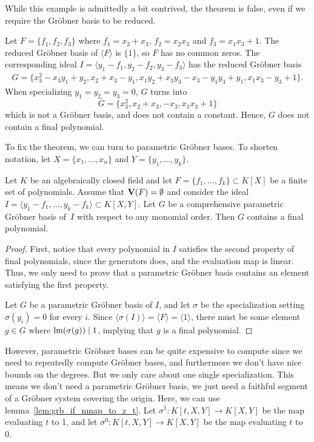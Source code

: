 While this example is admittedly a bit contrived, the theorem is false, even if we require the Gröbner basis to be reduced.

\begin{example}\upshape
    Let $F = \{f_1, f_2, f_3\}$ where $f_1 = x_2 + x_3$, $f_2 = x_2 x_3$ and $f_3 = x_1 x_3 + 1$. The reduced Gröbner basis of $\langle F \rangle$ is $\{1\}$, so $F$ has no common zeros. The corresponding ideal $I = \langle y_1 - f_1, y_2 - f_2, y_3 - f_3 \rangle$ has the reduced Gröbner basis
    \begin{gather*}
    G = \{ x_3^2 - x_3 y_1 + y_2, x_2 + x_3 - y_1, x_1 y_2 + x_3 y_3 - x_3 - y_1 y_3 + y_1, x_1 x_3 - y_3 + 1\}.
    \end{gather*}
    When specializing $y_1 = y_2 = y_3 = 0$, $G$ turns into
    \[\bar G = \{ x_3^2, x_2 + x_3, -x_3, x_1 x_3 + 1\}\]
    which is not a Gröbner basis, and does not contain a constant. Hence, $G$ does not contain a final polynomial.
\end{example}

To fix the theorem, we can turn to parametric Gröbner bases. To shorten notation, let $X = \{x_{1}, \dots, x_{n}\}$ and $Y = \{y_{1}, \dots, y_{k}\}$.

\begin{theorem}
  Let $K$ be an algebraically closed field and let $F = \{f_{1}, \dots, f_{k}\} \subset K[X]$ be a finite set of polynomials. Assume that $\operatorname{\mathbf V}(F) = \emptyset$ and consider the ideal $I = \langle y_{1} - f_{1}, \dots, y_{k} - f_{k} \rangle \subset K[X, Y]$. Let $G$ be a comprehensive parametric Gröbner basis of $\,I$ with respect to any monomial order. Then $G$ contains a final polynomial.
\end{theorem}
\begin{proof}
  First, notice that every polynomial in $I$ satisfies the second property of final polynomials, since the generators does, and the evaluation map is linear. Thus, we only need to prove that a parametric Gröbner basis contains an element satisfying the first property.

  Let $G$ be a parametric Gröbner basis of $I$, and let $\sigma$ be the specialization setting $\sigma(y_{i}) = 0$ for every $i$. Since $\langle \sigma(I) \rangle = \langle F \rangle = \langle 1 \rangle$, there must be some element $g \in G$ where $\operatorname{lm}(\sigma(g)) \mid 1$, implying that $g$ is a final polynomial.
\end{proof}

However, parametric Gröbner bases can be quite expensive to compute since we need to repeatedly compute Gröbner bases, and furthermore we don't have nice bounds on the degrees. But we only care about one single specialization. This means we don't need a parametric Gröbner basis, we just need a faithful segment of a Gröbner system covering the origin. Here, we can use lemma~\ref{lem:grb_if_nmap_to_z_t}. Let $\sigma^{1} : K[t, X, Y] \to K[X, Y]$ be the map evaluating $t$ to 1, and let $\sigma^{0} : K[t, X, Y] \to K[X, Y]$ be the map evaluating $t$ to 0.

